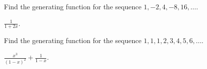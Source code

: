 \begin{questions}

	\begin{answer}
	\end{answer}



\question Find the generating function for the sequence $1, -2, 4, -8, 16, \ldots$.

	\begin{answer}
		$\frac{1}{1+2x}$.
	\end{answer}




\question Find the generating function for the sequence $1, 1, 1, 2, 3, 4, 5, 6, \ldots$.

	\begin{answer}
		$\frac{x^3}{(1-x)^2} + \frac{1}{1-x}$.
	\end{answer}






\end{questions}
